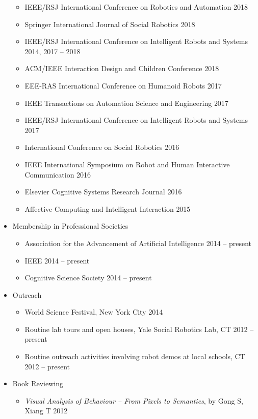 \documentclass[10pt,letterpaper]{article}
\newcommand{\thing}[2]{{#1} \hfill {#2}}
\begin{document}
\begin{itemize}
\begin{itemize}
	\item \thing{IEEE/RSJ International Conference on Robotics and Automation}{2018}
	\item \thing{Springer International Journal of Social Robotics}{2018}
	\item \thing{IEEE/RSJ International Conference on Intelligent Robots and Systems}{2014, 2017 -- 2018}
	\item \thing{ACM/IEEE Interaction Design and Children Conference}{2018}
	\item \thing{EEE-RAS International Conference on Humanoid Robots}{2017}
	\item \thing{IEEE Transactions on Automation Science and Engineering}{2017}
	\item \thing{IEEE/RSJ International Conference on Intelligent Robots and Systems}{2017}
	\item \thing{International Conference on Social Robotics}{2016}
	\item \thing{IEEE International Symposium on Robot and Human Interactive Communication}{2016}
	\item \thing{Elsevier Cognitive Systems Research Journal}{2016}
	\item \thing{Affective Computing and Intelligent Interaction}{2015}
	\end{itemize}
\item Membership in Professional Societies
	\begin{itemize}\setlength\itemsep{0em}
	\item\thing{ Association for the Advancement of Artificial Intelligence}{2014 -- present}
	\item \thing{IEEE}{2014 -- present}
	\item \thing{Cognitive Science Society}{2014 -- present}
	\end{itemize}
\item Outreach
	\begin{itemize}
	\item \thing{World Science Festival, New York City}{2014}
	\item \thing{Routine lab tours and open houses, Yale Social Robotics Lab, CT}{2012 -- present}
	\item \thing{Routine outreach activities involving robot demos at local schools, CT}{2012 -- present}
	\end{itemize}
\item Book Reviewing
	\begin{itemize}
	\item \thing{{\it Visual Analysis of Behaviour -- From Pixels to Semantics}, by Gong S, Xiang T}{2012}
	\end{itemize}
\end{itemize}
\end{document}
